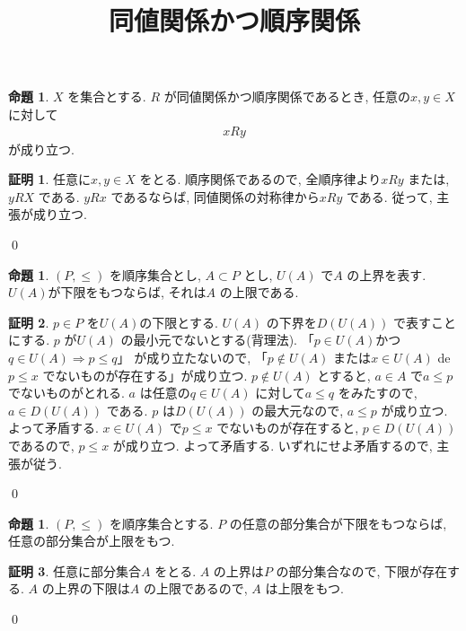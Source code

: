 \documentclass[10pt, fleqn, label-section=none]{bxjsarticle}
\title{同値関係かつ順序関係}
\date{}
\author{}
\theoremstyle{definition}
\newtheorem{prop}[dfn]{命題}
\newtheorem*{pf*}{証明}
\newcommand{\naraba}{\Rightarrow}
\renewcommand{\;}{\, ; \,}
\begin{document}
\maketitle

\section{}

\begin{prop}$X$ を集合とする. $R$ が同値関係かつ順序関係であるとき, 任意の$x, y \in X$ に対して
\begin{align*} x R y\end{align*}
が成り立つ. 
\end{prop}
\begin{pf*}任意に$x, y \in X$ をとる. 順序関係であるので, 全順序律より$x R y$ または, $y R X$ である. $y R x$ であるならば, 同値関係の対称律から$x R y$ である. 従って, 主張が成り立つ. 

\qed
\end{pf*}


\begin{prop}$(P, \leq) $ を順序集合とし, $A \subset P$ とし, $U(A)$ で$A$ の上界を表す. $U(A)$が下限をもつならば, それは$A$ の上限である. 

\end{prop}
\begin{pf*}$p \in P $ を$U(A)$の下限とする.  $U(A)$ の下界を$D(U(A))$ で表すことにする. $p$ が$U(A)$ の最小元でないとする(背理法). 「$p \in U(A)$かつ$q \in U(A) \naraba p \leq q$」 が成り立たないので, 「$p \notin U(A)$ または$x \in U(A)$  de
$p \leq x$ でないものが存在する」が成り立つ. $p \notin U(A)$ とすると, $a \in A$ で$a \leq p$ でないものがとれる. $a$ は任意の$q \in U(A)$ に対して$a \leq q$ をみたすので, $a \in D(U(A))$ である. $p$ は$D(U(A))$ の最大元なので, $a \leq p$ が成り立つ. よって矛盾する. $x \in U(A)$ で$p \leq x$ でないものが存在すると, $p \in D(U(A))$ であるので, $p \leq x$ が成り立つ. よって矛盾する. いずれにせよ矛盾するので, 主張が従う. 

\qed
\end{pf*}

\begin{prop}$(P, \leq)$ を順序集合とする. $P$ の任意の部分集合が下限をもつならば, 任意の部分集合が上限をもつ. 

\end{prop}
\begin{pf*}任意に部分集合$A$ をとる. $A$ の上界は$P$ の部分集合なので, 下限が存在する. $A$ の上界の下限は$A$ の上限であるので, $A$ は上限をもつ. 

\qed
\end{pf*}
\end{document}
